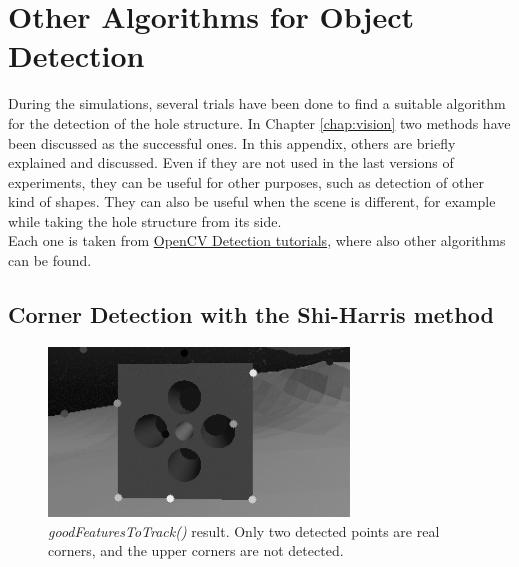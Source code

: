 

\chapter{Other Algorithms for Object Detection}
\label{chap:AppendixVision}
\ifpdf
    \graphicspath{{Vision/Figures/PNG/}{Vision/Figures/PDF/}{Vision/Figures/}}
\else
    \graphicspath{{Vision/Figures/EPS/}{Vision/Figures/}}
\fi

During the simulations, several trials have been done to find a suitable algorithm for the detection of the hole structure. In Chapter \ref{chap:vision} two methods have been discussed as the successful ones. In this appendix, others are briefly explained and discussed. Even if they are not used in the last versions of experiments, they can be useful for other purposes, such as detection of other kind of shapes. They can also be useful when the scene is different, for example while taking the hole structure from its side.\\
Each one is taken from \href{https://docs.opencv.org/3.4/d9/d97/tutorial_table_of_content_features2d.html}{OpenCV Detection tutorials}, where also other algorithms can be found.

\section{Corner Detection with the Shi-Harris method}

\begin{figure}[H]
	\centering
	\includegraphics[width=8.0cm]{goodFeatToTrack}
	\caption[Result of \textit{goodFeaturesToTrack()}]{\textit{goodFeaturesToTrack()} result. Only two detected points are real corners, and the upper corners are not detected.} 
	\label{fig:goodFeatToTrack}
\end{figure}


